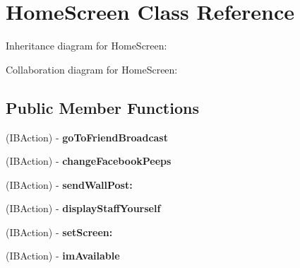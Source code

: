 \hypertarget{interface_home_screen}{
\section{\-Home\-Screen \-Class \-Reference}
\label{interface_home_screen}
}


\-Inheritance diagram for \-Home\-Screen\-:


\-Collaboration diagram for \-Home\-Screen\-:
\subsection*{\-Public \-Member \-Functions}
\begin{DoxyCompactItemize}
\item 
\hypertarget{interface_home_screen_a29a11b46caf4a2ba46499bc5674e57fe}{
(\-I\-B\-Action) -\/ {\bfseries go\-To\-Friend\-Broadcast}}
\label{interface_home_screen_a29a11b46caf4a2ba46499bc5674e57fe}

\item 
\hypertarget{interface_home_screen_a8c4af6d39e9a69156b86db8c5f0ce319}{
(\-I\-B\-Action) -\/ {\bfseries change\-Facebook\-Peeps}}
\label{interface_home_screen_a8c4af6d39e9a69156b86db8c5f0ce319}

\item 
\hypertarget{interface_home_screen_aee2df3de51cd10c418292cd41a406193}{
(\-I\-B\-Action) -\/ {\bfseries send\-Wall\-Post\-:}}
\label{interface_home_screen_aee2df3de51cd10c418292cd41a406193}

\item 
\hypertarget{interface_home_screen_a78f551ef74b97af0bf891cbb02439cef}{
(\-I\-B\-Action) -\/ {\bfseries display\-Staff\-Yourself}}
\label{interface_home_screen_a78f551ef74b97af0bf891cbb02439cef}

\item 
\hypertarget{interface_home_screen_ac66c1439e83989813a963804af50208d}{
(\-I\-B\-Action) -\/ {\bfseries set\-Screen\-:}}
\label{interface_home_screen_ac66c1439e83989813a963804af50208d}

\item 
\hypertarget{interface_home_screen_acbbc30105d865a0ba5ed0e4228469df7}{
(\-I\-B\-Action) -\/ {\bfseries im\-Available}}
\label{interface_home_screen_acbbc30105d865a0ba5ed0e4228469df7}

\end{DoxyCompactItemize}
